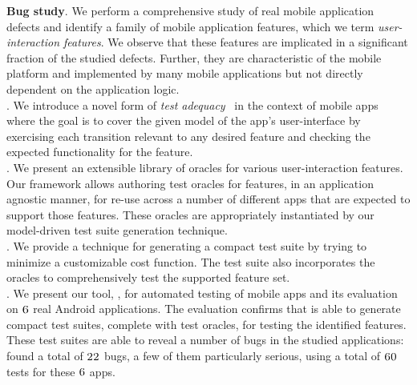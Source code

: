 {\bf Bug study}.  We perform a comprehensive study of
          real mobile application defects and identify a family of
          mobile application features, which we term \textit{user-interaction features}. We observe that these features are 
          implicated in a significant fraction of the studied defects. 
          Further, they are characteristic of the mobile platform and implemented 
          by many mobile applications but not directly dependent on the
          application logic.          
\\
{}.   We introduce a novel form of
          \emph{test adequacy}~\cite{GoodenoughGerhart1975} in the context of mobile apps where the
          goal is to cover the given model of the app's user-interface
          by exercising each transition relevant to any desired
          feature and checking the expected functionality for the feature.
\\
{}. We present an extensible 
				  library of oracles for various user-interaction features.
				  Our framework allows authoring test oracles for features, in an
	        application agnostic manner, for re-use across a number of
	        different apps that are expected to support those features.   
	        These oracles are appropriately instantiated by our model-driven
	        test suite generation technique. 
\\
{}. We provide a technique for generating a
          compact test suite by trying to minimize a customizable cost function. 
          The test suite also incorporates the oracles to comprehensively test the supported feature set.
\\
{}.  We present our tool, \tool{}, for
          automated testing of mobile apps and its evaluation on
          $\textsc{6}$ real Android applications.  The evaluation
          confirms that \tool{} is able to generate compact
          test suites, complete with test oracles, for testing the
          identified features. These test suites are able to reveal
          a number of bugs in the studied
          applications: \tool{} found a total of $\textsc{22}$ bugs, 
          a few of them particularly serious, using a total of $\textsc{60}$ tests for these $\textsc{6}$ apps.
